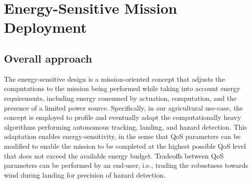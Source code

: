 \documentclass[conference]{IEEEtran}
\begin{document}


\section{Energy-Sensitive Mission Deployment} 
\label{sec:approach}

\subsection{Overall approach}

The energy-sensitive design is a mission-oriented concept that adjusts
the computations to the mission being performed while taking into
account energy requirements, including energy consumed by actuation,
computation, and the presence of a limited power source. Specifically,
in our agricultural use-case, the concept is employed to profile and eventually adapt the
computationally heavy algorithms performing autonomous tracking,
landing, and hazard detection. This adaptation enables
energy-sensitivity, in the sense that QoS parameters can be modified
to enable the mission to be completed at the highest possible QoS
level that does not exceed the available energy budget. Tradeoffs
between QoS parameters can be performed by an end-user, i.e., trading
the robustness towards wind during landing for precision of hazard
detection.
\end{document}
